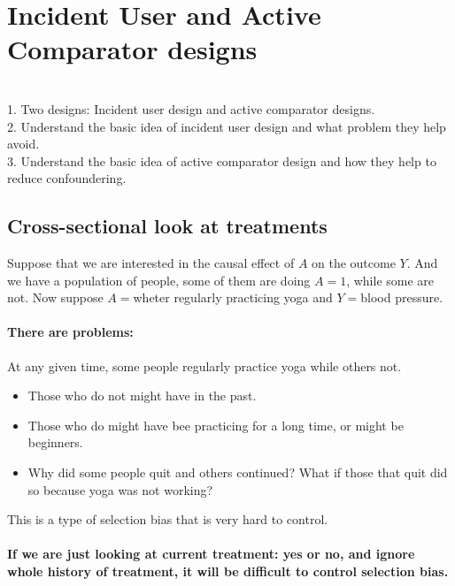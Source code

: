 \newpage \section{Incident User and Active Comparator designs}
\\
1. Two designs: Incident user design and active comparator designs.\\
2. Understand the basic idea of incident user design and what problem they help avoid.\\
3. Understand the basic idea of active comparator design and how they help to reduce confoundering.

\subsection{Cross-sectional look at treatments}
Suppose that we are interested in the causal effect of $A$ on the outcome $Y$. And we have a population of people, some of them are doing $A=1$, while some are not. Now suppose $A=$wheter regularly practicing yoga and $Y=$blood pressure. 

\paragraph{There are problems:} At any given time, some people regularly practice yoga while others not.
\begin{itemize}
	\item Those who do not might have in the past.
	\item Those who do might have bee practicing for a long time, or might be beginners.
	\item Why did some people quit and others continued? What if those that quit did so because yoga was not working?
\end{itemize}

This is a type of {\color{red} selection bias} that is very hard to control. 

\paragraph{{\color{red} If we are just looking at current treatment: yes or no, and ignore whole history of treatment, it will be difficult to control selection bias.}}

